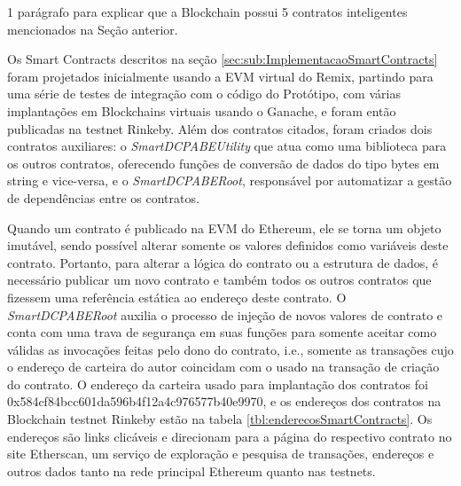 \documentclass[a4paper,11pt]{article}
\begin{document}
{\color{Magenta} 1 parágrafo para explicar que a Blockchain possui 5 contratos inteligentes mencionados na Seção anterior.}

Os Smart Contracts descritos na seção \ref{sec:sub:ImplementacaoSmartContracts} foram projetados inicialmente usando a EVM virtual do Remix, partindo para uma série de testes de integração com o código do Protótipo, com várias implantações em Blockchains virtuais usando o Ganache, e foram então publicadas na testnet Rinkeby.
Além dos contratos citados, foram criados dois contratos auxiliares: o \emph{SmartDCPABEUtility} que atua como uma biblioteca para os outros contratos, oferecendo funções de conversão de dados do tipo bytes em string e vice-versa, e o \emph{SmartDCPABERoot}, responsável por automatizar a gestão de dependências entre os contratos.

Quando um contrato é publicado na EVM do Ethereum, ele se torna um objeto imutável, sendo possível alterar somente os valores definidos como variáveis deste contrato.
Portanto, para alterar a lógica do contrato ou a estrutura de dados, é necessário publicar um novo contrato e também todos os outros contratos que fizessem uma referência estática ao endereço deste contrato.
O \emph{SmartDCPABERoot} auxilia o processo de injeção de novos valores de contrato e conta com uma trava de segurança em suas funções para somente aceitar como válidas as invocações feitas pelo dono do contrato, i.e., somente as transações cujo o endereço de carteira do autor coincidam com o usado na transação de criação do contrato.
O endereço da carteira usado para implantação dos contratos foi 0x584cf84bcc601da596b4f12a4c976577b40e9970, e os endereços dos contratos na Blockchain testnet Rinkeby estão na tabela \ref{tbl:enderecosSmartContracts}.
Os endereços são links clicáveis e direcionam para a página do respectivo contrato no site Etherscan, um serviço de exploração e pesquisa de transações, endereços e outros dados tanto na rede principal Ethereum quanto nas testnets.
\end{document}
